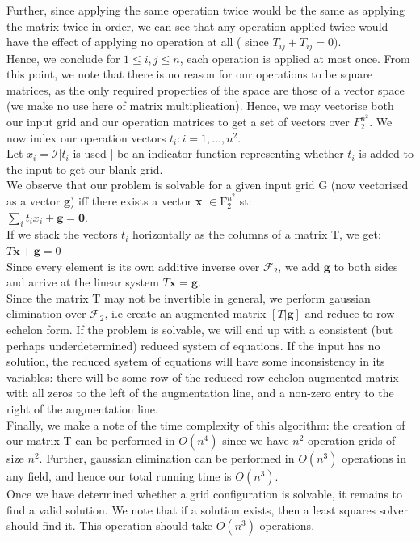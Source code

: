 \documentclass[12pt]{article}
\begin{document}
\begin{enumerate}[leftmargin=\labelsep]
    Further, since applying the same operation twice would be the same as applying the matrix twice in order, we can see that any operation applied twice would have the effect of applying no operation at all ( since $T_{ij} + T_{ij} = 0)$.\\
    Hence, we conclude for $1 \le i,j \le n$, each operation is applied at most once. From this point, we note that there is no reason for our operations to be square matrices, as the only required properties of the space are those of a vector space (we make no use here of matrix multiplication). Hence, we may vectorise both our input grid and our operation matrices to get a set of vectors over $F_{2}^{n^2}$. We now index our operation vectors $t_i: i = 1, \dots, n^2$.\\
    Let $x_{i} = \mathcal{I} [t_{i} $ is used $]$ be an indicator function representing whether $t_i$ is added to the input to get our blank grid.\\
    We observe that our problem is solvable for a given input grid G (now vectorised as a vector \textbf{g}) iff there exists a vector \textbf{x} $\in \mathrm{F}_{2}^{n^2}$ st:\\
    $\sum_{i} t_{i} x_{i} + \mathbf{g} = \mathbf{0}.$\\
    If we stack the vectors $t_{i}$ horizontally as the columns of a matrix T, we get:\\
    $T\mathbf{x} + \mathbf{g} = 0$\\
    Since every element is its own additive inverse over $\mathcal{F}_{2}$, we add $\mathbf{g}$ to both sides and arrive at the linear system $T \mathbf{x} = \mathbf{g}$.\\
    Since the matrix T may not be invertible in general, we perform gaussian elimination over $\mathcal{F}_{2}$, i.e create an augmented matrix $[T|\mathbf{g}]$ and reduce to row echelon form. If the problem is solvable, we will end up with a consistent (but perhaps underdetermined) reduced system of equations. If the input has no solution, the reduced system of equations will have some inconsistency in its variables: there will be some row of the reduced row echelon augmented matrix with all zeros to the left of the augmentation line, and a non-zero entry to the right of the augmentation line. \\

    Finally, we make a note of the time complexity of this algorithm: the creation of our matrix T can be performed in $O(n^{4})$ since we have $n^2$ operation grids of size $n^{2}$. Further, gaussian elimination can be performed in $O(n^{3})$ operations in any field, and hence our total running time is $O(n^3)$. \\
    
    Once we have determined whether a grid configuration is solvable, it remains to find a valid solution. We note that if a solution exists, then a least squares solver should find it. This operation should take $O(n^3)$ operations.

\end{enumerate}
\end{document}
